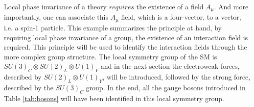Local phase invariance of a theory $requires$ the existence of a field $A_{\mu}$. 
And more importantly, one can associate this $A_{\mu}$ field, which is a four-vector, to a vector, i.e. a spin-1 particle. 
This example summarizes the principle at hand, by requiring local phase invariance of a group, the existence of an interaction field is required. 
This principle will be used to identify the interaction fields through the more complex group structure. 
\newpara
\noindent\justify
The local symmetry group of the SM is $SU(3)_{C}\otimes SU(2)_{L}\otimes U(1)_{Y}$ and in the next section the electroweak forces, described by $SU(2)_{L}\otimes U(1)_{Y}$, will be introduced, followed by the strong force, described by the $SU(3)_{C}$ group. 
In the end, all the gauge bosons introduced in Table \ref{tab:bosons} will have been identified in this local symmetry group. 

